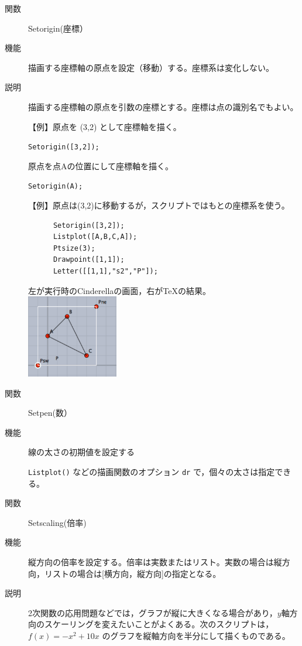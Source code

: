 \documentclass[papersize,a4paper,12pt,uplatex]{jsarticle}
\begin{document}
\begin{description}
\vspace{\baselineskip}
\hypertarget{setorigin}{}
\item[関数]  Setorigin(座標）      
\item[機能]  描画する座標軸の原点を設定（移動）する。座標系は変化しない。
\item[説明]  描画する座標軸の原点を引数の座標とする。座標は点の識別名でもよい。

\vspace{\baselineskip}
【例】原点を (3,2) として座標軸を描く。

\hspace{10mm}  \verb|Setorigin([3,2]);|

原点を点Aの位置にして座標軸を描く。

\hspace{10mm}  \verb|Setorigin(A);|  

\vspace{\baselineskip}
  【例】原点は(3,2)に移動するが，スクリプトではもとの座標系を使う。
\begin{verbatim}
      Setorigin([3,2]);
      Listplot([A,B,C,A]);
      Ptsize(3);
      Drawpoint([1,1]);
      Letter([[1,1],"s2","P"]);
\end{verbatim}
  左が実行時のCinderellaの画面，右が\TeX の結果。\\

\hspace{10mm} \includegraphics[bb=0 0 227 205 , width=4cm]{Fig/setorigin.pdf}      

\vspace{\baselineskip}
\hypertarget{setpen}{}
\item[関数]  Setpen(数）      
\item[機能]  線の太さの初期値を設定する

\verb|Listplot()| などの描画関数のオプション \verb|dr| で，個々の太さは指定できる。

\vspace{\baselineskip}
\hypertarget{setscaling}{}
\item[関数]  Setscaling(倍率)
\item[機能]  縦方向の倍率を設定する。倍率は実数またはリスト。実数の場合は縦方向，リストの場合は[横方向，縦方向]の指定となる。
\item[説明]  2次関数の応用問題などでは，グラフが縦に大きくなる場合があり，$y$軸方向のスケーリングを変えたいことがよくある。次のスクリプトは，$f(x)=-x^2+10x$ のグラフを縦軸方向を半分にして描くものである。


\end{description}
\end{document}
